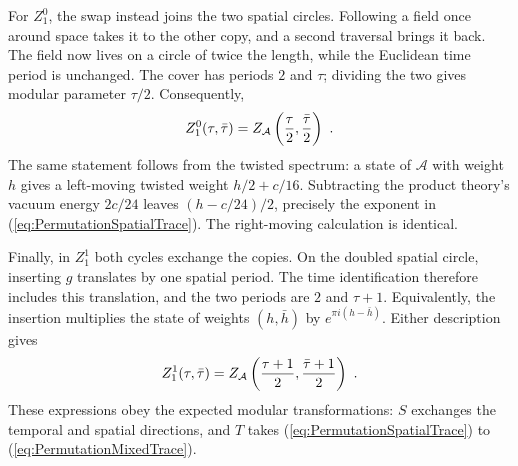 \documentclass[12pt]{article}
\numberwithin{equation}{section}
\newcommand{\bea}{\begin{eqnarray}}
\newcommand{\eea}{\end{eqnarray}}
\def\cA{\mathcal{A}}
\theoremstyle{remark}
\begin{document}
For $Z^0_1$, the swap instead joins the two spatial circles. Following a field once around space takes it to the other copy, and a second traversal brings it back. The field now lives on a circle of twice the length, while the Euclidean time period is unchanged. The cover has periods $2$ and $\tau$; dividing the two gives modular parameter $\tau/2$. Consequently,
\bea \label{eq:PermutationSpatialTrace}
Z^0_1(\tau,\bar\tau)=Z_{\cA}\left({\tau\over2},{\bar\tau\over2}\right)~.
\eea
The same statement follows from the twisted spectrum: a state of $\cA$ with weight $h$ gives a left-moving twisted weight $h/2+c/16$. Subtracting the product theory's vacuum energy $2c/24$ leaves $(h-c/24)/2$, precisely the exponent in (\ref{eq:PermutationSpatialTrace}). The right-moving calculation is identical.

Finally, in $Z^1_1$ both cycles exchange the copies. On the doubled spatial circle, inserting $g$ translates by one spatial period. The time identification therefore includes this translation, and the two periods are $2$ and $\tau+1$. Equivalently, the insertion multiplies the state of weights $(h,\bar h)$ by $e^{\pi i(h-\bar h)}$. Either description gives
\bea \label{eq:PermutationMixedTrace}
Z^1_1(\tau,\bar\tau)=Z_{\cA}\left({\tau+1\over2},{\bar\tau+1\over2}\right)~.
\eea
These expressions obey the expected modular transformations: $S$ exchanges the temporal and spatial directions, and $T$ takes (\ref{eq:PermutationSpatialTrace}) to (\ref{eq:PermutationMixedTrace}).
\end{document}
